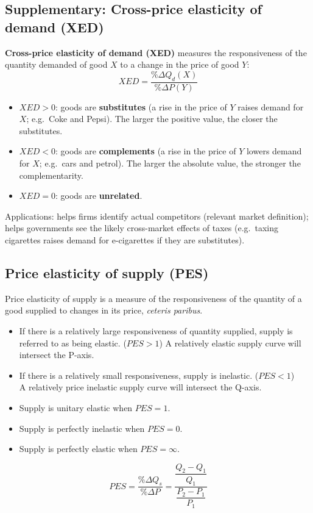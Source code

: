 \documentclass[a4paper,12pt]{article}
\newcommand{\needbold}[1]{\textcolor{red!70!black}{\textbf{#1}}}
\begin{document}
\subsection{Supplementary: Cross-price elasticity of demand (XED)}
\needbold{Cross-price elasticity of demand (XED)} measures the responsiveness of the quantity demanded of good $X$ to a change in the price of good $Y$:
\[XED=\dfrac{\%\Delta Q_d(X)}{\%\Delta P(Y)}\]
\begin{itemize}
  \item $XED>0$: goods are \textbf{substitutes} (a rise in the price of $Y$ raises demand for $X$; e.g.\ Coke and Pepsi). The larger the positive value, the closer the substitutes.
  \item $XED<0$: goods are \textbf{complements} (a rise in the price of $Y$ lowers demand for $X$; e.g.\ cars and petrol). The larger the absolute value, the stronger the complementarity.
  \item $XED=0$: goods are \textbf{unrelated}.
\end{itemize}
Applications: helps firms identify actual competitors (relevant market definition); helps governments see the likely cross-market effects of taxes (e.g.\ taxing cigarettes raises demand for e-cigarettes if they are substitutes).
\subsection{Price elasticity of supply (PES)}
Price elasticity of supply is a measure of the responsiveness of the quantity of a good supplied to changes in its price, \emph{ceteris paribus}. 
\begin{itemize}
  \item If there is a relatively large responsiveness of quantity supplied, supply is referred to as being elastic. ($PES>1$) A relatively elastic supply curve will intersect the P-axis.
  \item If there is a relatively small responsiveness, supply is inelastic. ($PES<1$) \\A relatively price inelastic supply curve will intersect the Q-axis.
  \item Supply is unitary elastic when $PES = 1$.
  \item Supply is perfectly inelastic when $PES = 0$.
  \item Supply is perfectly elastic when $PES =\infty$.
\end{itemize}
\[PES=\dfrac{\%\Delta Q_s}{\%\Delta P}=\dfrac{\dfrac{Q_2-Q_1}{Q_1}}{\dfrac{P_2-P_1}{P_1}}\]
\end{document}
